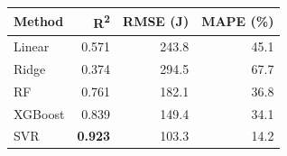 \begin{tabular}{@{}lrrr@{}}
\toprule
\textbf{Method} & \textbf{R\textsuperscript{2}} & \textbf{RMSE (J)} & \textbf{MAPE (\%)} \\
\midrule
Linear & 0.571 & 243.8 & 45.1 \\
Ridge & 0.374 & 294.5 & 67.7 \\
RF & 0.761 & 182.1 & 36.8 \\
XGBoost & 0.839 & 149.4 & 34.1 \\
SVR & \textbf{0.923} & 103.3 & 14.2 \\
\bottomrule
\end{tabular}